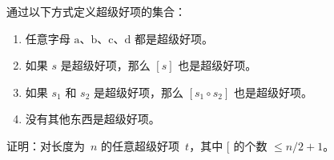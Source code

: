 \documentclass[../../../include/open-logic-section]{subfiles}
\begin{document}
\begin{prob}
  通过以下方式定义超级好项的集合：
  \begin{enumerate}
  \item 任意字母 $\mathrm{a}$、$\mathrm{b}$、$\mathrm{c}$、$\mathrm{d}$ 都是超级好项。
  \item 如果 $s$ 是超级好项，那么 $[s]$ 也是超级好项。
  \item 如果 $s_1$ 和 $s_2$ 是超级好项，那么 $[s_1 \circ s_2]$ 也是超级好项。
  \item 没有其他东西是超级好项。
  \end{enumerate}
  证明：对长度为~$n$ 的任意超级好项~$t$，其中 $[$ 的个数 $\le n/2 +1$。
\end{prob}
\end{document}

